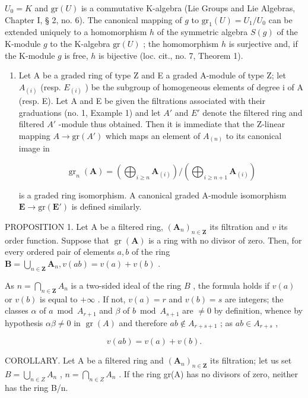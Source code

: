 \(U_{0} = K\) and \(\text{gr}(U)\) is a commutative K-algebra (Lie Groups and Lie Algebras, Chapter I, § 2, no. 6). The canonical mapping of \(g\) to \(\text{gr}_{1}(U) = U_{1}/U_{0}\) can be extended uniquely to a homomorphism \(h\) of the symmetric algebra \(S(g)\) of the K-module \(g\) to the K-algebra \(\text{gr}(U)\) ; the homomorphism \(h\) is surjective and, if the K-module \(g\) is free, \(h\) is bijective (loc. cit., no. 7, Theorem 1).

\begin{enumerate}
\def\labelenumi{(\arabic{enumi})}
\setcounter{enumi}{4}
\tightlist
\item
  Let A be a graded ring of type Z and E a graded A-module of type Z; let \(A_{(i)}\) (resp. \(E_{(i)}\) ) be the subgroup of homogeneous elements of degree i of A (resp. E). Let A and E be given the filtrations associated with their graduations (no. 1, Example 1) and let \(A'\) and \(E'\) denote the filtered ring and filtered \(A'\) -module thus obtained. Then it is immediate that the Z-linear mapping \(A \to \text{gr}(A')\) which maps an element of \(A_{(n)}\) to its canonical image in

\[
\operatorname{gr} _ {n} (\mathbf {A}) = \left(\bigoplus_ {i \geqslant n} \mathbf {A} _ {(i)}\right) / \left(\bigoplus_ {i \geqslant n + 1} \mathbf {A} _ {(i)}\right)
\]

is a graded ring isomorphism. A canonical graded A-module isomorphism \(\mathbf{E} \to \mathrm{gr}(\mathbf{E}')\) is defined similarly.
\end{enumerate}

PROPOSITION 1. Let A be a filtered ring, \((\mathbf{A}_n)_{n\in \mathbf{Z}}\) its filtration and \(v\) its order function. Suppose that \(\operatorname {gr}(\mathbf{A})\) is a ring with no divisor of zero. Then, for every ordered pair of elements \(a,b\) of the ring \(\mathbf{B} = \bigcup_{n\in \mathbf{Z}}\mathbf{A}_n,v(ab) = v(a) + v(b)\) .

As \(n = \bigcap_{n \in \mathbf{Z}} A_n\) is a two-sided ideal of the ring \(B\) , the formula holds if \(v(a)\) or \(v(b)\) is equal to \(+\infty\) . If not, \(v(a) = r\) and \(v(b) = s\) are integers; the classes \(\alpha\) of \(a \bmod A_{r+1}\) and \(\beta\) of \(b \bmod A_{s+1}\) are \(\neq 0\) by definition, whence by hypothesis \(\alpha \beta \neq 0\) in \(\operatorname{gr}(A)\) and therefore \(ab \notin A_{r+s+1}\) ; as \(ab \in A_{r+s}\) ,

\[
v (a b) = v (a) + v (b).
\]

COROLLARY. Let A be a filtered ring and \((\mathbf{A}_{n})_{n\in\mathbf{Z}}\) its filtration; let us set \(B=\bigcup_{n\in Z}A_{n}\) , \(n=\bigcap_{n\in Z}A_{n}\) . If the ring gr(A) has no divisors of zero, neither has the ring B/n.

